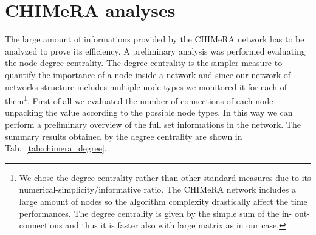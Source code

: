 \documentclass{standalone}
\begin{document}
\section[CHIMeRA analyses]{CHIMeRA analyses}\label{chimera:res}

The large amount of informations provided by the \textsf{CHIMeRA} network has to be analyzed to prove its efficiency.
A preliminary analysis was performed evaluating the node degree centrality.
The degree centrality is the simpler measure to quantify the importance of a node inside a network and since our network-of-networks structure includes multiple node types we monitored it for each of them\footnote{
  We chose the degree centrality rather than other standard measures due to its numerical-simplicity/informative ratio.
  The \textsf{CHIMeRA} network includes a large amount of nodes so the algorithm complexity drastically affect the time performances.
  The degree centrality is given by the simple sum of the in- out-connections and thus it is faster also with large matrix as in our case.
}.
First of all we evaluated the number of connections of each node unpacking the value according to the possible node types.
In this way we can perform a preliminary overview of the full set informations in the network.
The summary results obtained by the degree centrality are shown in Tab.~\ref{tab:chimera_degree}.
\end{document}
